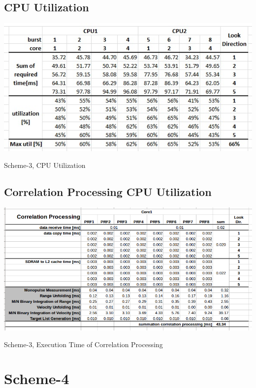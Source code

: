 \section{CPU Utilization}
\label{app:sch3:cpu_util}
\begin{table}[h!]
	\centering
	\includegraphics[width=140mm]{figures/scheme4_util}
	\caption{Scheme-3, CPU Utilization}
	\label{fig:mm:scheme4_util}
\end{table}

\section{Correlation Processing CPU Utilization}
\label{app:sch4:corr_cpu_util}
\begin{table}[h!]
	\centering
	\includegraphics[width=160mm]{figures/scheme4_corr_proc}
	\caption{Scheme-3, Execution Time of Correlation Processing}
	\label{fig:mm:scheme4_corr_calc}
\end{table}


\chapter{Scheme-4}
\label{app:sch4}
\renewcommand{\algorithmicrequire}{\textbf{Input:}}
\renewcommand{\algorithmicensure}{\textbf{Output:}}


